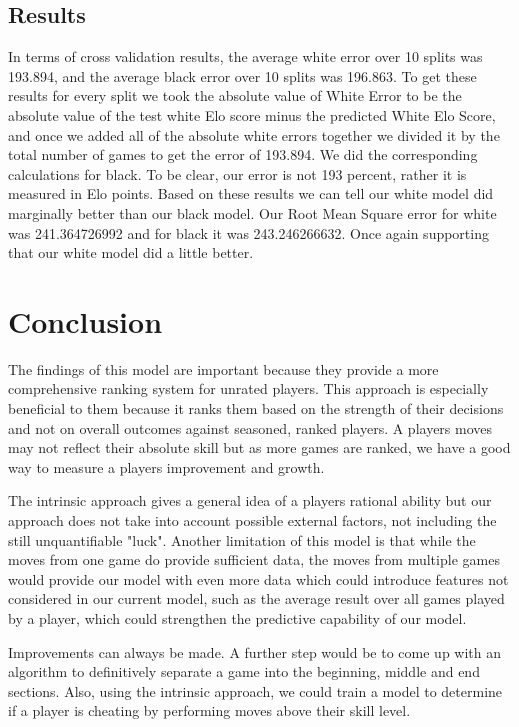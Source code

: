 \documentclass{acm_proc_article-sp}
\begin{document}
\subsection{Results}
In terms of cross validation results, the average white error over 10 splits was 193.894, and the average black error over 10 splits was 196.863. To get these results for every split we took the absolute value of White Error to be the absolute value of the test white Elo score minus the predicted White Elo Score, and once we added all of the absolute white errors together we divided it by the total number of games to get the error of 193.894. We did the corresponding calculations for black. To be clear, our error is not 193 percent, rather it is measured in Elo points. Based on these results we can tell our white model did marginally better than our black model. Our Root Mean Square error for white was 241.364726992 and for black it was 243.246266632. Once again supporting that our white model did a little better. 

\section{Conclusion}


The findings of this model are important because they provide a more comprehensive ranking system for unrated players. This approach is especially beneficial to them because it ranks them based on the strength of their decisions and not on overall outcomes against seasoned, ranked players. A players moves may not reflect their absolute skill but as more games are ranked, we have a good way to measure a players improvement and growth.

The intrinsic approach gives a general idea of a players rational ability but our approach does not take into account possible external factors, not including the still unquantifiable "luck". Another limitation of this model is that while the moves from one game do provide sufficient data, the moves from multiple games would provide our model with even more data which could introduce features not considered in our current model, such as the average result over all games played by a player, which could strengthen the predictive capability of our model.

Improvements can always be made. A further step would be to come up with an algorithm to definitively separate a game into the beginning, middle and end sections. Also, using the intrinsic approach, we could train a model to determine if a player is cheating by performing moves above their skill level. 




\end{document}
